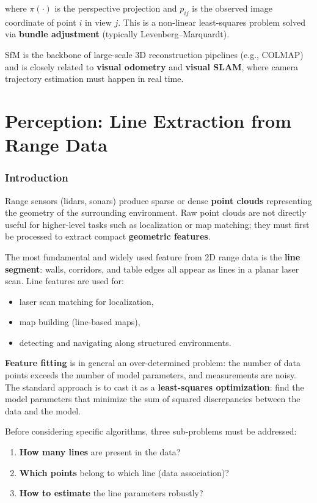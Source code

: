 \documentclass[11pt,a4paper]{article}
\theoremstyle{definition}
\theoremstyle{plain}
\theoremstyle{remark}
\begin{document}
where $\pi(\cdot)$ is the perspective projection and $p_{ij}$ is the observed image coordinate of point $i$ in view $j$. This is a non-linear least-squares problem solved via \textbf{bundle adjustment} (typically Levenberg--Marquardt).

SfM is the backbone of large-scale 3D reconstruction pipelines (e.g., COLMAP) and is closely related to \textbf{visual odometry} and \textbf{visual SLAM}, where camera trajectory estimation must happen in real time.



\part{Perception: Line Extraction from Range Data}

\section{Introduction}

Range sensors (lidars, sonars) produce sparse or dense \textbf{point clouds} representing the geometry of the surrounding environment. Raw point clouds are not directly useful for higher-level tasks such as localization or map matching; they must first be processed to extract compact \textbf{geometric features}.

The most fundamental and widely used feature from 2D range data is the \textbf{line segment}: walls, corridors, and table edges all appear as lines in a planar laser scan. Line features are used for:
\begin{itemize}
    \item laser scan matching for localization,
    \item map building (line-based maps),
    \item detecting and navigating along structured environments.
\end{itemize}

\textbf{Feature fitting} is in general an over-determined problem: the number of data points exceeds the number of model parameters, and measurements are noisy. The standard approach is to cast it as a \textbf{least-squares optimization}: find the model parameters that minimize the sum of squared discrepancies between the data and the model.

Before considering specific algorithms, three sub-problems must be addressed:
\begin{enumerate}
    \item \textbf{How many lines} are present in the data?
    \item \textbf{Which points} belong to which line (data association)?
    \item \textbf{How to estimate} the line parameters robustly?
\end{enumerate}
\end{document}
